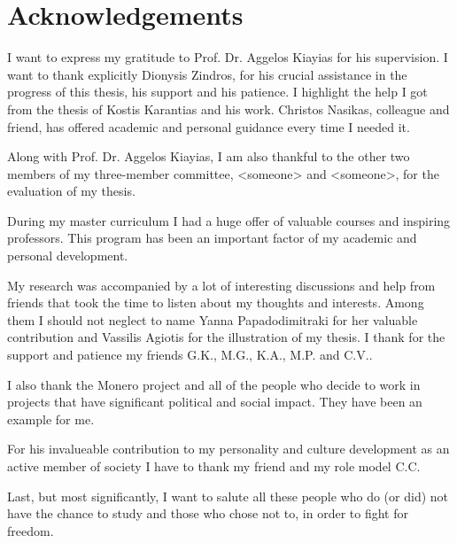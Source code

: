 \chapter*{Acknowledgements}
I want to express my gratitude to Prof. Dr. Aggelos Kiayias for his supervision. I want to thank explicitly Dionysis Zindros, for his crucial assistance in the progress of this thesis, his support and his patience. I highlight the help I got from the thesis of Kostis Karantias and his work. Christos Nasikas, colleague and friend, has offered academic and personal guidance every time I needed it.

Along with Prof. Dr. Aggelos Kiayias, I am also thankful to the other two members of my three-member committee, <someone> and <someone>, for the evaluation of my thesis.

During my master curriculum I had a huge offer of valuable courses and inspiring professors. This program has been an important factor of my academic and personal development.

My research was accompanied by a lot of interesting discussions and help from friends that took the time to listen about my thoughts and interests. Among them I should not neglect to name Yanna Papadodimitraki for her valuable contribution and Vassilis Agiotis for the illustration of my thesis. I thank for the support and patience my friends G.K., M.G., K.A., M.P. and C.V..

I also thank the Monero project and all of the people who decide to work in projects that have significant political and social impact. They have been an example for me.

For his invalueable contribution to my personality and culture development as an active member of society I have to thank my friend and my role model C.C.

Last, but most significantly, I want to salute all these people who do (or did) not have the chance to study and those who chose not to, in order to fight for freedom.
%
